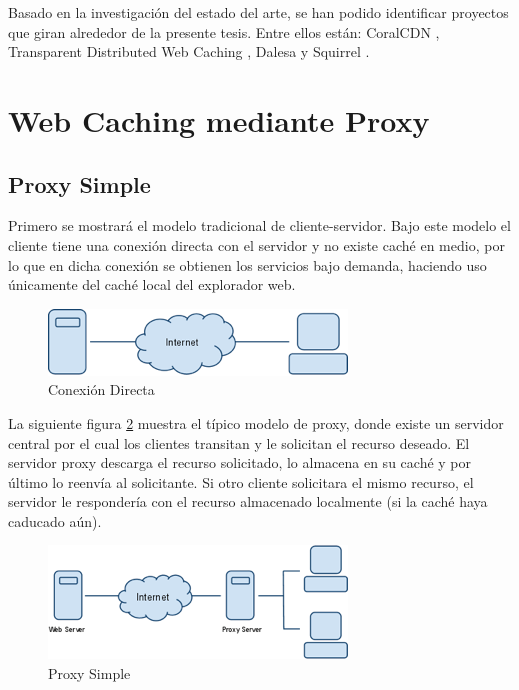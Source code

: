 Basado en la investigación del estado del arte, se han podido identificar proyectos que giran alrededor de la presente tesis. Entre ellos están: CoralCDN \cite{freedman:2004}, Transparent Distributed Web Caching \cite{liang:2001}, Dalesa \cite{wathsala:2009} y Squirrel \cite{rowstron:2001}.



\section{Web Caching mediante Proxy}


\subsection{Proxy Simple}

Primero se mostrará el modelo tradicional de cliente-servidor. Bajo este modelo el cliente tiene una conexión directa con el servidor y no existe caché en medio, por lo que en dicha conexión se obtienen los servicios bajo demanda, haciendo uso únicamente del caché local del explorador web.

\begin{figure}[h]
  \centering
    \includegraphics[scale=1]{gfx/proxy_simple_1}
  \caption{Conexión Directa}
  \label{proxy_simple_1}		
\end{figure}

La siguiente figura \ref{proxy_simple_2} muestra el típico modelo de proxy, donde existe un servidor central por el cual los clientes transitan y le solicitan el recurso deseado. El servidor proxy descarga el recurso solicitado, lo almacena en su caché y por último lo reenvía al solicitante. Si otro cliente solicitara el mismo recurso, el servidor le respondería con el recurso almacenado localmente (si la caché haya caducado aún).

\begin{figure}[h]
  \centering
    \includegraphics[scale=1]{gfx/proxy_simple_2}
  \caption{Proxy Simple}
  \label{proxy_simple_2}
\end{figure}

